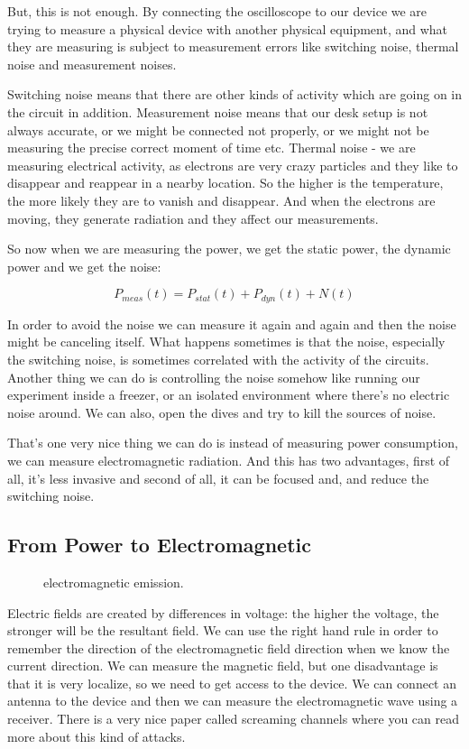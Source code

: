 But, this is not enough. By connecting the oscilloscope to our device we are
trying to measure a physical device with another physical equipment, and what
they are measuring is subject to measurement errors like switching noise,
thermal noise and measurement noises.

Switching noise means that there are other kinds of activity which are going on
in the circuit in addition. Measurement noise means that our desk setup is not
always accurate, or we might be connected not properly, or we might not be
measuring the precise correct moment of time etc. Thermal noise - we are
measuring electrical activity, as electrons are very crazy particles and they
like to disappear and reappear in a nearby location. So the higher is the
temperature, the more likely they are to vanish and disappear. And when the
electrons are moving, they generate radiation and they affect our measurements.

So now when we are measuring the power, we get the static power, the dynamic
power and we get the noise:

\begin{displaymath}
    P_{meas}(t)=P_{stat}(t) + P_{dyn}(t) + N(t)
\end{displaymath}

In order to avoid the noise we can measure it again and again and then the noise
might be canceling itself. What happens sometimes is that the noise, especially
the switching noise, is sometimes correlated with the activity of the circuits.
Another thing we can do is controlling the noise somehow like running our
experiment inside a freezer, or an isolated environment where there's no
electric noise around. We can also, open the dives and try to kill the sources
of noise.

That's one very nice thing we can do is instead of measuring power consumption,
we can measure electromagnetic radiation. And this has two advantages, first of
all, it's less invasive and second of all, it can be focused and, and reduce the
switching noise.

\subsection { From Power to Electromagnetic }

\begin{figure}[!ht]
    \centering
    
    \caption{electromagnetic emission.} \label{fig:electromagnetic emission}
\end{figure}

Electric fields are created by differences in voltage: the higher the voltage,
the stronger will be the resultant field. We can use the right hand rule in
order to remember the direction of the electromagnetic field direction when we
know the current direction. We can measure the magnetic field, but one
disadvantage is that it is very localize, so we need to get access to the
device. We can connect an antenna to the device and then we can measure the
electromagnetic wave using a receiver. There is a very nice paper called
screaming channels where you can read more about this kind of attacks.
